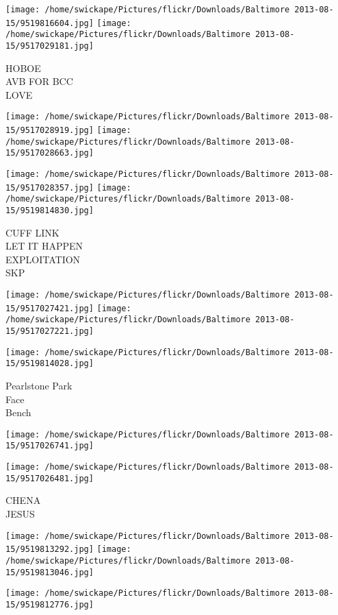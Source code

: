 \documentclass[10pt,letterpaper]{article}
\begin{document}
\vspace{0.25in}
\texttt{[image: /home/swickape/Pictures/flickr/Downloads/Baltimore 2013-08-15/9519816604.jpg]}
\texttt{[image: /home/swickape/Pictures/flickr/Downloads/Baltimore 2013-08-15/9517029181.jpg]}

HOBOE\\
AVB FOR BCC\\
LOVE
\pagebreak

\texttt{[image: /home/swickape/Pictures/flickr/Downloads/Baltimore 2013-08-15/9517028919.jpg]}
\texttt{[image: /home/swickape/Pictures/flickr/Downloads/Baltimore 2013-08-15/9517028663.jpg]}

\texttt{[image: /home/swickape/Pictures/flickr/Downloads/Baltimore 2013-08-15/9517028357.jpg]}
\texttt{[image: /home/swickape/Pictures/flickr/Downloads/Baltimore 2013-08-15/9519814830.jpg]}

CUFF LINK\\
LET IT HAPPEN\\
EXPLOITATION\\
SKP
\pagebreak

\texttt{[image: /home/swickape/Pictures/flickr/Downloads/Baltimore 2013-08-15/9517027421.jpg]}
\texttt{[image: /home/swickape/Pictures/flickr/Downloads/Baltimore 2013-08-15/9517027221.jpg]}

\vspace{0.25in}
\texttt{[image: /home/swickape/Pictures/flickr/Downloads/Baltimore 2013-08-15/9519814028.jpg]}

Pearlstone Park\\
Face\\
Bench
\pagebreak

\texttt{[image: /home/swickape/Pictures/flickr/Downloads/Baltimore 2013-08-15/9517026741.jpg]}

\vspace{0.25in}
\texttt{[image: /home/swickape/Pictures/flickr/Downloads/Baltimore 2013-08-15/9517026481.jpg]}

CHENA\\
JESUS
\pagebreak

\texttt{[image: /home/swickape/Pictures/flickr/Downloads/Baltimore 2013-08-15/9519813292.jpg]}
\texttt{[image: /home/swickape/Pictures/flickr/Downloads/Baltimore 2013-08-15/9519813046.jpg]}

\vspace{0.25in}
\texttt{[image: /home/swickape/Pictures/flickr/Downloads/Baltimore 2013-08-15/9519812776.jpg]}
\end{document}
